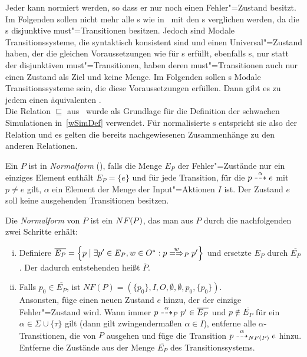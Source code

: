 Jeder \MEIO{} kann normiert werden, so dass er nur noch einen Fehler"=Zustand
besitzt. Im Folgenden sollen nicht mehr alle \MIA{}s wie
in~\cite{Vogler2016MIA3} mit den \MEIO{}s verglichen werden, da die \MIA{}s
disjunktive must"=Transitionen besitzen. Jedoch sind Modale Transitionssysteme,
die syntaktisch konsistent sind und einen Universal"=Zustand haben, der die
gleichen Voraussetzungen wie für \MIA{}s erfüllt, ebenfalls \MIA{}s, nur statt
der disjunktiven must"=Transitionen, haben deren must"=Transitionen auch nur
einen Zustand als Ziel und keine Menge. Im Folgenden sollen \MIA{}s Modale
Transitionssysteme sein, die diese Voraussetzungen erfüllen. Dann gibt es zu
jedem \MEIO{} einen äquivalenten \MIA{}.\\
Die Relation $\sqsubseteq$ aus~\cite{Vogler2016MIA3} wurde als Grundlage für
die Definition der schwachen Simulationen in~\ref{wSimDef} verwendet. Für
normalisierte \MEIO{}s entspricht sie also der Relation \wasRel{} und es gelten
die bereits nachgewiesenen Zusammenhänge zu den anderen Relationen.

\begin{Def}[Normalform]
  \label{NFDef}
  Ein \MEIO{} $P$ ist in \emph{Normalform} (\NF{}), falls die Menge $E_P$ der
  Fehler"=Zustände nur ein einziges Element enthält $E_P=\{e\}$ und für jede
  Transition, für die $p \may[\alpha] e$ mit $p\neq e$ gilt, $\alpha$ ein
  Element der Menge der Input"=Aktionen $I$ ist. Der Zustand $e$ soll keine
  ausgehenden Transitionen besitzen.

  Die \emph{Normalform} von $P$ ist ein \MEIO{} $NF (P)$, das man aus $P$
  durch die nachfolgenden zwei Schritte erhält:
  \begin{enumerate}[(i)]
    \item Definiere $\overline{E_P} = \left\{p \mid \exists p'\in E_P, w\in
      O^*: p\weakmay[w]_P p'\right\}$ und ersetzte $E_P$ durch
      $\overline{E_P}$. Der dadurch entstehenden \MEIO{} heißt $\overline{P}$.
    \item Falls $p_0\in \overline{E_P}$, ist $NF(P) = \left(\{p_0\}, I, O,
      \emptyset , \emptyset , p_0, \{p_0\}\right)$.\\
      Ansonsten, füge einen neuen Zustand $e$ hinzu, der der einzige
      Fehler"=Zustand wird. Wann immer $p \may[\alpha]_P p'\in \overline{E_P}$
      und $p\notin \overline{E_P}$ für ein $\alpha\in \Sigma \cup \{\tau\}$
      gilt (dann gilt zwingendermaßen $\alpha \in I$), entferne alle
      $\alpha$-Transitionen, die von $P$ ausgehen und füge die Transition
      $p\may[\alpha]_{\NF (P)} e$ hinzu. Entferne die Zustände aus der Menge
      $\overline{E_P}$ des Transitionssystems.
  \end{enumerate}
\end{Def}

